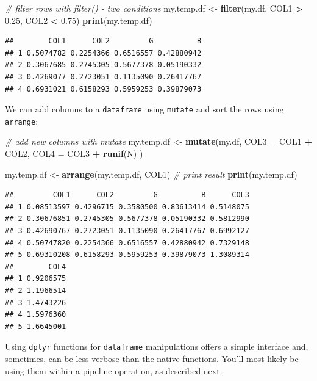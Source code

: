 \documentclass[11pt,]{book}
\newenvironment{Shaded}{\begin{snugshade}}{\end{snugshade}}
\newcommand{\KeywordTok}[1]{\textcolor[rgb]{0.27,0.27,0.27}{\textbf{#1}}}
\newcommand{\DataTypeTok}[1]{\textcolor[rgb]{0.27,0.27,0.27}{#1}}
\newcommand{\FloatTok}[1]{\textcolor[rgb]{0.06,0.06,0.06}{#1}}
\newcommand{\StringTok}[1]{\textcolor[rgb]{0.5,0.5,0.5}{#1}}
\newcommand{\CommentTok}[1]{\textcolor[rgb]{0.56,0.35,0.01}{\textit{#1}}}
\newcommand{\OperatorTok}[1]{\textcolor[rgb]{0.81,0.36,0.00}{\textbf{#1}}}
\newcommand{\NormalTok}[1]{#1}
\begin{document}
\begin{Shaded}
\begin{Highlighting}[]
\CommentTok{# filter rows with filter() - two conditions}
\NormalTok{my.temp.df <-}\StringTok{ }\KeywordTok{filter}\NormalTok{(my.df, COL1 }\OperatorTok{>}\StringTok{ }\FloatTok{0.25}\NormalTok{, }
\NormalTok{                            COL2 }\OperatorTok{<}\StringTok{ }\FloatTok{0.75}\NormalTok{)}
\KeywordTok{print}\NormalTok{(my.temp.df)}
\end{Highlighting}
\end{Shaded}

\begin{verbatim}
##        COL1      COL2         G          B
## 1 0.5074782 0.2254366 0.6516557 0.42880942
## 2 0.3067685 0.2745305 0.5677378 0.05190332
## 3 0.4269077 0.2723051 0.1135090 0.26417767
## 4 0.6931021 0.6158293 0.5959253 0.39879073
\end{verbatim}

We can add columns to a \texttt{dataframe} using \texttt{mutate} and
sort the rows using \texttt{arrange}: 

\begin{Shaded}
\begin{Highlighting}[]
\CommentTok{# add new columns with mutate}
\NormalTok{my.temp.df <-}\StringTok{ }\KeywordTok{mutate}\NormalTok{(my.df, }\DataTypeTok{COL3 =}\NormalTok{ COL1 }\OperatorTok{+}\StringTok{ }\NormalTok{COL2,}
                            \DataTypeTok{COL4 =}\NormalTok{ COL3 }\OperatorTok{+}\StringTok{ }\KeywordTok{runif}\NormalTok{(N) )}

\NormalTok{my.temp.df <-}\StringTok{ }\KeywordTok{arrange}\NormalTok{(my.temp.df, COL1)}
\CommentTok{# print result}
\KeywordTok{print}\NormalTok{(my.temp.df)}
\end{Highlighting}
\end{Shaded}

\begin{verbatim}
##         COL1      COL2         G          B      COL3
## 1 0.08513597 0.4296715 0.3580500 0.83613414 0.5148075
## 2 0.30676851 0.2745305 0.5677378 0.05190332 0.5812990
## 3 0.42690767 0.2723051 0.1135090 0.26417767 0.6992127
## 4 0.50747820 0.2254366 0.6516557 0.42880942 0.7329148
## 5 0.69310208 0.6158293 0.5959253 0.39879073 1.3089314
##        COL4
## 1 0.9206575
## 2 1.1966514
## 3 1.4743226
## 4 1.5976360
## 5 1.6645001
\end{verbatim}

Using \texttt{dplyr} functions for \texttt{dataframe} manipulations
offers a simple interface and, sometimes, can be less verbose than the
native functions. You'll most likely be using them within a pipeline
operation, as described next.
\end{document}
